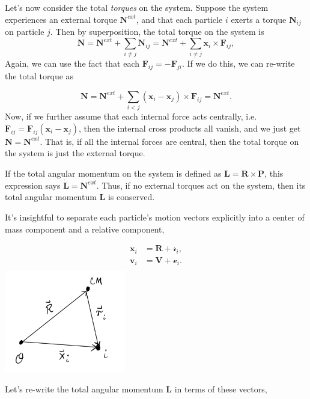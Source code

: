 \documentclass[
  letterpaper,
  DIV=11,
  numbers=noendperiod]{scrreprt}
\begin{document}
Let's now consider the total \emph{torques} on the system. Suppose the
system experiences an external torque \(\mathbf{N}^{ext}\), and that
each particle \(i\) exerts a torque \(\mathbf{N}_{ij}\) on particle
\(j\). Then by superposition, the total torque on the system is \[
\mathbf{N} = \mathbf{N}^{ext} + \sum_{i \neq j} \mathbf{N}_{ij} = \mathbf{N}^{ext} + \sum_{i \neq j} \mathbf{x}_i \times \mathbf{F}_{ij},
\] Again, we can use the fact that each
\(\mathbf{F}_{ij} = -\mathbf{F}_{ji}\). If we do this, we can re-write
the total torque as

\[
\mathbf{N} = \mathbf{N}^{ext} + \sum_{i<j} (\mathbf{x}_{i}-\mathbf{x}_{j}) \times \mathbf{F}_{ij} = \mathbf{N}^{ext}.
\] Now, if we further assume that each internal force acts centrally,
i.e.~\(\mathbf{F}_{ij} = \mathbf{F}_{ij}(\mathbf{x}_{i}-\mathbf{x}_{j})\),
then the internal cross products all vanish, and we just get
\(\mathbf{N} = \mathbf{N}^{ext}\). That is, if all the internal forces
are central, then the total torque on the system is just the external
torque.

If the total angular momentum on the system is defined as
\(\mathbf{L} = \mathbf{R} \times \mathbf{P}\), this expression says
\(\mathbf{\dot L} = \mathbf{N}^{ext}\). Thus, if no external torques act
on the system, then its total angular momentum \(\mathbf{L}\) is
conserved.

It's insightful to separate each particle's motion vectors explicitly
into a center of mass component and a relative component,

\[
\begin{align*} 
\mathbf{x}_i &= \mathbf{R} + \boldsymbol{\mathscr{r}}_i, \\
\mathbf{v}_i &= \mathbf{V} + \boldsymbol{\mathscr{v}}_i. \\
\end{align*}
\]
\includegraphics[width=2.08333in,height=\textheight]{classical-mechanics/./resources/image-20230213071525149.png}

Let's re-write the total angular momentum \(\mathbf{L}\) in terms of
these vectors,
\end{document}
